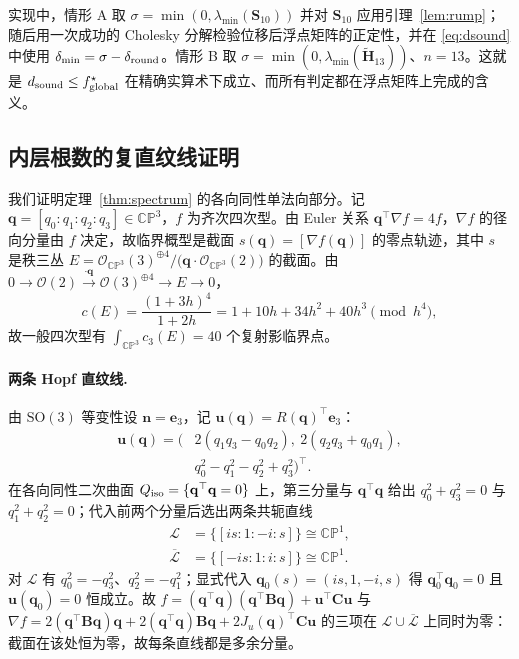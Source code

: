 实现中，情形 A 取 $\sigma=\min(0,\lambda_{\min}(\mathbf S_{10}))$ 并对 $\mathbf S_{10}$ 应用引理~\ref{lem:rump}；随后用一次成功的 Cholesky 分解检验位移后浮点矩阵的正定性，并在 \eqref{eq:dsound} 中使用 $\delta_{\min}=\sigma-\delta_{\rm round}$。情形 B 取 $\sigma=\min(0,\lambda_{\min}(\tilde{\mathbf H}_{13}))$、$n=13$。这就是 $d_{\rm sound}\le f^\star_{\rm global}$ 在精确实算术下成立、而所有判定都在浮点矩阵上完成的含义。

\subsection{内层根数的复直纹线证明}\label{app:ruled}
我们证明定理~\ref{thm:spectrum} 的各向同性单法向部分。记 $\mathbf q=[q_0:q_1:q_2:q_3]\in\mathbb{CP}^3$，$f$ 为齐次四次型。由 Euler 关系 $\mathbf q^\top\nabla f=4f$，$\nabla f$ 的径向分量由 $f$ 决定，故临界概型是截面 $s(\mathbf q)=[\nabla f(\mathbf q)]$ 的零点轨迹，其中 $s$ 是秩三丛 $E=\mathcal O_{\mathbb{CP}^3}(3)^{\oplus4}/\big(\mathbf q\cdot\mathcal O_{\mathbb{CP}^3}(2)\big)$ 的截面。由 $0\to\mathcal O(2)\xrightarrow{\cdot\mathbf q}\mathcal O(3)^{\oplus4}\to E\to0$，
\begin{equation}
c(E)=\frac{(1+3h)^4}{1+2h}=1+10h+34h^2+40h^3\pmod{h^4},
\label{eq:cE}
\end{equation}
故一般四次型有 $\int_{\mathbb{CP}^3}c_3(E)=40$ 个复射影临界点。

\paragraph{两条 Hopf 直纹线.} 由 $\mathrm{SO}(3)$ 等变性设 $\mathbf n=\mathbf e_3$，记 $\mathbf u(\mathbf q)=R(\mathbf q)^\top\mathbf e_3$：
\begin{equation}
\begin{aligned}
\mathbf u(\mathbf q)=\big(&2(q_1q_3-q_0q_2),\ 2(q_2q_3+q_0q_1),\\
&q_0^2-q_1^2-q_2^2+q_3^2\big)^\top .
\end{aligned}
\end{equation}
在各向同性二次曲面 $Q_{\rm iso}=\{\mathbf q^\top\mathbf q=0\}$ 上，第三分量与 $\mathbf q^\top\mathbf q$ 给出 $q_0^2+q_3^2=0$ 与 $q_1^2+q_2^2=0$；代入前两个分量后选出两条共轭直线
\begin{equation}
\begin{aligned}
\mathcal L&=\{[i s:1:-i:s]\}\cong\mathbb{CP}^1,\\
\overline{\mathcal L}&=\{[-i s:1:i:s]\}\cong\mathbb{CP}^1 .
\end{aligned}
\end{equation}
对 $\mathcal L$ 有 $q_0^2=-q_3^2$、$q_2^2=-q_1^2$；显式代入 $\mathbf q_0(s)=(is,1,-i,s)$ 得 $\mathbf q_0^\top\mathbf q_0=0$ 且 $\mathbf u(\mathbf q_0)=0$ 恒成立。故 $f=(\mathbf q^\top\mathbf q)(\mathbf q^\top\mathbf B\mathbf q)+\mathbf u^\top\mathbf C\mathbf u$ 与
$\nabla f=2(\mathbf q^\top\mathbf B\mathbf q)\mathbf q+2(\mathbf q^\top\mathbf q)\mathbf B\mathbf q+2J_u(\mathbf q)^\top\mathbf C\mathbf u$
的三项在 $\mathcal L\cup\overline{\mathcal L}$ 上同时为零：截面在该处恒为零，故每条直线都是多余分量。

